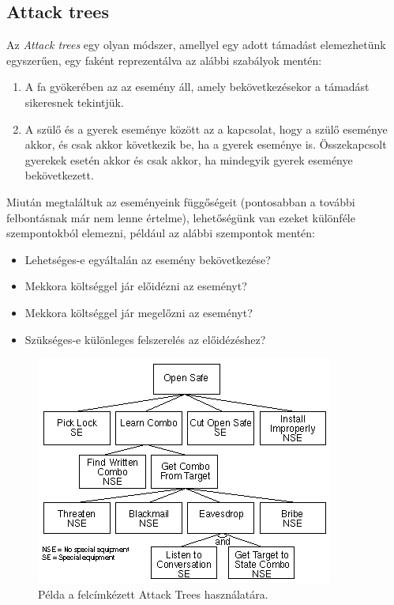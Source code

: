 \subsection{Attack trees}

Az \emph{Attack trees}\cite{schneier1999attack} egy olyan módszer, amellyel egy adott támadást
elemezhetünk egyszerűen, egy faként reprezentálva az alábbi szabályok mentén:
\begin{enumerate}
    \item A fa gyökerében az az esemény áll, amely bekövetkezésekor a támadást sikeresnek tekintjük.
    \item A szülő és a gyerek eseménye között az a kapcsolat, hogy a szülő eseménye akkor, és csak
        akkor következik be, ha a gyerek eseménye is.  Összekapcsolt gyerekek esetén akkor és csak
        akkor, ha mindegyik gyerek eseménye bekövetkezett.
\end{enumerate}
Miután megtaláltuk az eseményeink függőségeit (pontosabban a további felbontásnak már nem lenne
értelme), lehetőségünk van ezeket különféle szempontokból elemezni, például az alábbi szempontok
mentén:
\begin{itemize}
    \item Lehetséges-e egyáltalán az esemény bekövetkezése?
    \item Mekkora költséggel jár előidézni az eseményt?
    \item Mekkora költséggel jár megelőzni az eseményt?
    \item Szükséges-e különleges felszerelés az előidézéshez?
\end{itemize}

\begin{figure}[h]
    \includegraphics[height=0.4\textheight]{figures/attacktrees.png}
    \centering
    \caption{Példa a felcímkézett Attack Trees használatára. \cite{schneier1999attack}}
\end{figure}

